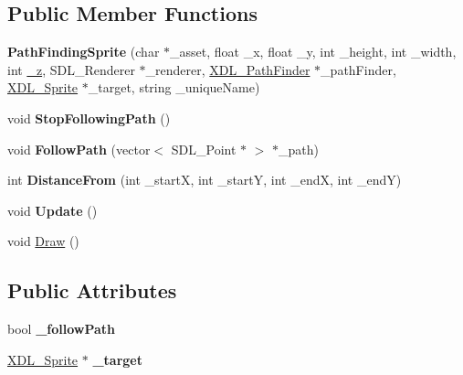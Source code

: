 \subsection*{Public Member Functions}
\begin{DoxyCompactItemize}
\item 
\hypertarget{class_path_finding_sprite_a8c2b54d8ba8941cdd6895791138fabae}{{\bfseries Path\-Finding\-Sprite} (char $\ast$\-\_\-asset, float \-\_\-x, float \-\_\-y, int \-\_\-height, int \-\_\-width, int \hyperlink{class_x_d_l___game_object_a62a08106992c783507c669f71a6dd6a6}{\-\_\-z}, S\-D\-L\-\_\-\-Renderer $\ast$\-\_\-renderer, \hyperlink{class_x_d_l___path_finder}{X\-D\-L\-\_\-\-Path\-Finder} $\ast$\-\_\-path\-Finder, \hyperlink{class_x_d_l___sprite}{X\-D\-L\-\_\-\-Sprite} $\ast$\-\_\-target, string \-\_\-unique\-Name)}\label{class_path_finding_sprite_a8c2b54d8ba8941cdd6895791138fabae}

\item 
\hypertarget{class_path_finding_sprite_a95c7d23d13c54bc51ae38424490d4ee8}{void {\bfseries Stop\-Following\-Path} ()}\label{class_path_finding_sprite_a95c7d23d13c54bc51ae38424490d4ee8}

\item 
\hypertarget{class_path_finding_sprite_a0a17743cc552020d4a66364622f52fa9}{void {\bfseries Follow\-Path} (vector$<$ S\-D\-L\-\_\-\-Point $\ast$ $>$ $\ast$\-\_\-path)}\label{class_path_finding_sprite_a0a17743cc552020d4a66364622f52fa9}

\item 
\hypertarget{class_path_finding_sprite_ac0cbe99d021ca34cd212433923e08c55}{int {\bfseries Distance\-From} (int \-\_\-start\-X, int \-\_\-start\-Y, int \-\_\-end\-X, int \-\_\-end\-Y)}\label{class_path_finding_sprite_ac0cbe99d021ca34cd212433923e08c55}

\item 
\hypertarget{class_path_finding_sprite_aca2646354d5f4cce321beb2535074ab1}{void {\bfseries Update} ()}\label{class_path_finding_sprite_aca2646354d5f4cce321beb2535074ab1}

\item 
void \hyperlink{class_path_finding_sprite_a1fdc88d9b985f6f7b7ce8de4eaa31a5a}{Draw} ()
\end{DoxyCompactItemize}
\subsection*{Public Attributes}
\begin{DoxyCompactItemize}
\item 
\hypertarget{class_path_finding_sprite_a8b3908f51ffe18650ba2c529c38a3ed8}{bool {\bfseries \-\_\-follow\-Path}}\label{class_path_finding_sprite_a8b3908f51ffe18650ba2c529c38a3ed8}

\item 
\hypertarget{class_path_finding_sprite_a362c590ccafec132466cec86d0b0f788}{\hyperlink{class_x_d_l___sprite}{X\-D\-L\-\_\-\-Sprite} $\ast$ {\bfseries \-\_\-target}}\label{class_path_finding_sprite_a362c590ccafec132466cec86d0b0f788}

\end{DoxyCompactItemize}
